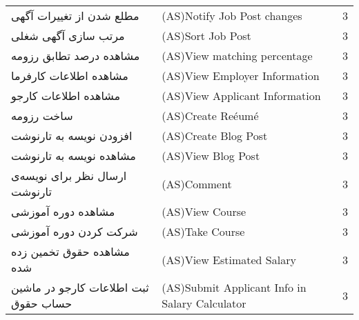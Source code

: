 \documentclass[12pt]{article}
\begin{document}
\begin{table}[]
\begin{tabular}{lll}
			مطلع شدن از تغییرات آگهی‌            & (AS)Notify Job Post changes                                                                                   & 3     \\
			مرتب سازی آگهی شغلی                  & (AS)Sort Job Post                                                                                             & 3     \\
			مشاهده درصد تطابق رزومه              & (AS)View matching percentage                                                                                  & 3     \\
			مشاهده اطلاعات کارفرما               & (AS)View Employer Information                                                                                 & 3     \\
			مشاهده اطلاعات کارجو                 & (AS)View Applicant Information                                                                                & 3     \\
			ساخت رزومه                           & (AS)Create Reéumé                                                                                             & 3     \\
			افزودن نویسه به تارنوشت              & (AS)Create Blog Post                                                                                          & 3     \\
			مشاهده نویسه به تارنوشت              & (AS)View Blog Post                                                                                            & 3     \\
			ارسال نظر برای نویسه‌ی تارنوشت       & (AS)Comment                                                                                                   & 3     \\
			مشاهده دوره آموزشی                   & (AS)View Course                                                                                               & 3     \\
			شرکت کردن دوره آموزشی                & (AS)Take Course                                                                                               & 3     \\
			مشاهده حقوق تخمین زده شده            & (AS)View Estimated Salary                                                                                     & 3     \\
			ثبت اطلاعات کارجو در ماشین حساب حقوق & (AS)Submit Applicant Info in Salary Calculator                                                                & 3     \\

\end{tabular}
\end{table}
\end{document}
